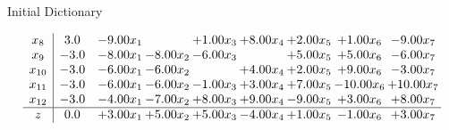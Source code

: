\documentclass[8pt]{article}
\begin{document}
Initial Dictionary 

\[\begin{array}{c| c c@{\hskip 2pt} c@{\hskip 2pt} c@{\hskip 2pt} c@{\hskip 2pt} c@{\hskip 2pt} c@{\hskip 2pt} c@{\hskip 2pt} }
 x_{8}   &  3.0 & -9.00 x_{1} &   & +  1.00 x_{3} & +  8.00 x_{4} & +  2.00 x_{5} & +  1.00 x_{6} & -9.00 x_{7}\\
 x_{9}   &  -3.0 & -8.00 x_{1} & -8.00 x_{2} & -6.00 x_{3} &   & +  5.00 x_{5} & +  5.00 x_{6} & -6.00 x_{7}\\
 x_{10}   &  -3.0 & -6.00 x_{1} & -6.00 x_{2} &   & +  4.00 x_{4} & +  2.00 x_{5} & +  9.00 x_{6} & -3.00 x_{7}\\
 x_{11}   &  -3.0 & -6.00 x_{1} & -6.00 x_{2} & -1.00 x_{3} & +  3.00 x_{4} & +  7.00 x_{5} & -10.00 x_{6} & + 10.00 x_{7}\\
 x_{12}   &  -3.0 & -4.00 x_{1} & -7.00 x_{2} & +  8.00 x_{3} & +  9.00 x_{4} & -9.00 x_{5} & +  3.00 x_{6} & +  8.00 x_{7}\\
\hline
z    &  0.0 & +  3.00 x_{1} & +  5.00 x_{2} & +  5.00 x_{3} & -4.00 x_{4} & +  1.00 x_{5} & -1.00 x_{6} & +  3.00 x_{7}\\
\end{array}\]
\end{document}

